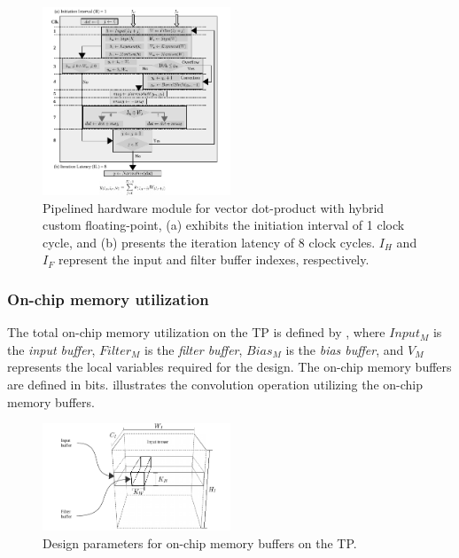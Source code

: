 \begin{figure}[t!]
	\centering
	\includegraphics[width=0.5\textwidth]{../figures/dot_product_hybrid.pdf}
	\caption{Pipelined hardware module for vector dot-product with hybrid custom floating-point, (a) exhibits the initiation interval of 1 clock cycle, and (b) presents
		the iteration latency of 8 clock cycles. $I_H$ and $I_F$ represent the input and filter buffer indexes, respectively.}
	\label{fig:dot_product_hybrid}
\end{figure}

\subsubsection{\textbf{On-chip memory utilization}}
The total on-chip memory utilization on the TP is defined by , where $Input_{M}$ is the \emph{input buffer}, $Filter_{M}$ is the \emph{filter buffer}, $Bias_{M}$ is the \emph{bias buffer}, and $V_{M}$ represents the local variables required for the design. The on-chip memory buffers are defined in bits.  illustrates the convolution operation utilizing the on-chip memory buffers.

\begin{figure}[t!]
	\centering
	\includegraphics[width=0.5\textwidth]{../figures/accelerator_buffers.pdf}
	\caption{Design parameters for on-chip memory buffers on the TP.}
	\label{fig:accelerator_buffers}
\end{figure}

